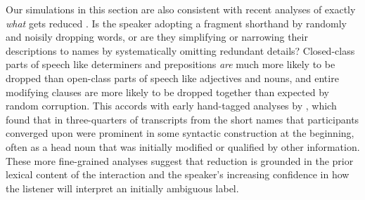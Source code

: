 Our simulations in this section are also consistent with recent analyses of exactly \emph{what} gets reduced \cite{hawkins2020characterizing}.
Is the speaker adopting a fragment shorthand by randomly and noisily dropping words, or are they simplifying or narrowing their descriptions to names by systematically omitting redundant details?
Closed-class parts of speech like determiners and prepositions \emph{are} much more likely to be dropped than open-class parts of speech like adjectives and nouns, and entire modifying clauses are more likely to be dropped together than expected by random corruption.
This accords with early hand-tagged analyses by , which found that in three-quarters of transcripts from  the short names that participants converged upon were prominent in some syntactic construction at the beginning, often as a head noun that was initially modified or qualified by other information. 
These more fine-grained analyses suggest that reduction is grounded in the prior lexical content of the interaction and the speaker's increasing confidence in how the listener will interpret an initially ambiguous label. 

